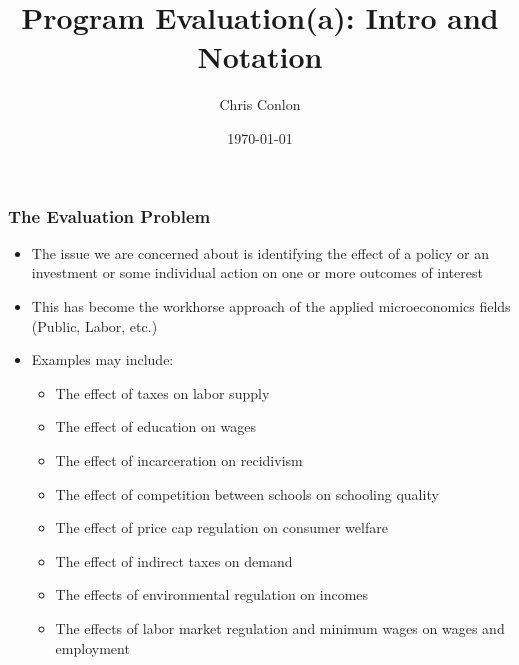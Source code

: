 \documentclass[xcolor=pdftex,dvipsnames,table,mathserif,aspectratio=169]{beamer}
\begin{document}
\title{Program Evaluation(a): Intro and Notation}
\author{Chris Conlon}
\date{\today}

\frame{\titlepage}


\begin{frame}
\frametitle{The Evaluation Problem}
\begin{itemize}
\item The issue we are concerned about is identifying the effect of a policy or an investment or some individual action on one or more outcomes of interest
\item This has become the workhorse approach of the applied microeconomics fields (Public, Labor, etc.)
\item Examples may include:
\begin{itemize}
\item The effect of taxes on labor supply
\item The effect of education on wages
\item The effect of incarceration on recidivism
\item The effect of competition between schools on schooling quality
\item The effect of price cap regulation on consumer welfare
\item The effect of indirect taxes on demand
\item The effects of environmental regulation on incomes
\item The effects of labor market regulation and minimum wages on wages and employment
\end{itemize}
\end{itemize}
\end{frame}
\end{document}
